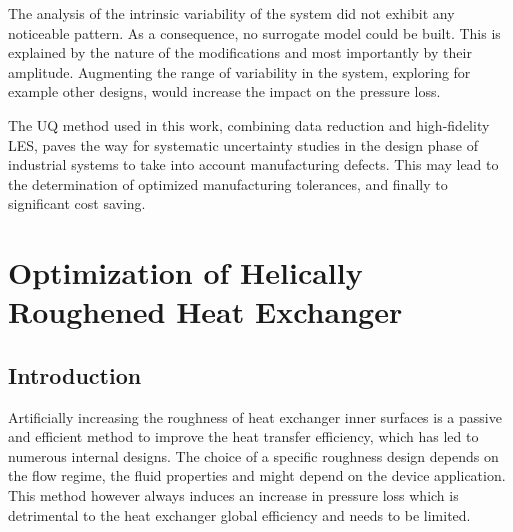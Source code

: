 The analysis of the intrinsic variability of the system did not exhibit any noticeable pattern. As a consequence, no surrogate model could be built. This is explained by the nature of the modifications and most importantly by their amplitude. Augmenting the range of variability in the system, exploring for example other designs, would increase the impact on the pressure loss. %

The UQ method used in this work, combining data reduction and high-fidelity LES, paves the way for systematic uncertainty studies in the design phase of industrial systems to take into account manufacturing defects. This may lead to the determination of optimized manufacturing tolerances, and finally to significant cost saving.

\chapter{Optimization of Helically Roughened Heat Exchanger}

\section{Introduction}

Artificially increasing the roughness of heat exchanger inner surfaces is a passive and efficient method to improve the heat transfer efficiency, which has led to numerous internal designs. The choice of a specific roughness design depends on the flow regime, the fluid properties and might depend on the device application. This method however always induces an increase in pressure loss which is detrimental to the heat exchanger global efficiency and needs to be limited.\\

